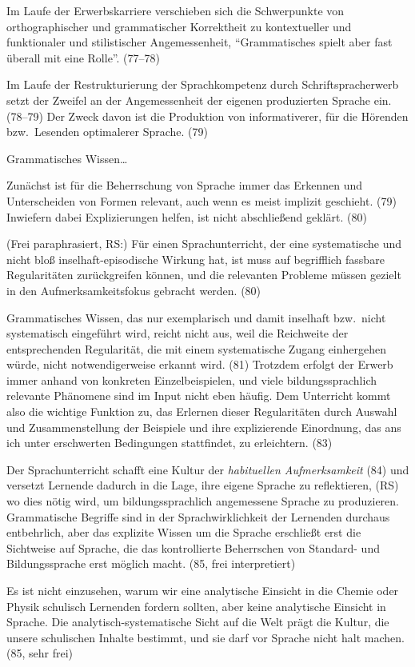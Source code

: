 Im Laufe der Erwerbskarriere verschieben sich die Schwerpunkte von orthographischer und grammatischer Korrektheit zu kontextueller und funktionaler und stilistischer Angemessenheit, "`Grammatisches spielt aber fast überall mit eine Rolle"'. (77--78)

Im Laufe der Restrukturierung der Sprachkompetenz durch Schriftspracherwerb setzt der Zweifel an der Angemessenheit der eigenen produzierten Sprache ein. (78--79)
Der Zweck davon ist die Produktion von informativerer, für die Hörenden bzw.\ Lesenden optimalerer Sprache. (79)

Grammatisches Wissen\ldots

Zunächst ist für die Beherrschung von Sprache immer das Erkennen und Unterscheiden von Formen relevant, auch wenn es meist implizit geschieht. (79)
Inwiefern dabei Explizierungen helfen, ist nicht abschließend geklärt. (80)

(Frei paraphrasiert, RS:) Für einen Sprachunterricht, der eine systematische und nicht bloß inselhaft-episodische Wirkung hat, ist muss auf begrifflich fassbare Regularitäten zurückgreifen können, und die relevanten Probleme müssen gezielt in den Aufmerksamkeitsfokus gebracht werden. (80)

Grammatisches Wissen, das nur exemplarisch und damit inselhaft bzw.\ nicht systematisch eingeführt wird, reicht nicht aus, weil die Reichweite der entsprechenden Regularität, die mit einem systematische Zugang einhergehen würde, nicht notwendigerweise erkannt wird. (81)
Trotzdem erfolgt der Erwerb immer anhand von konkreten Einzelbeispielen, und viele bildungssprachlich relevante Phänomene sind im Input nicht eben häufig.
Dem Unterricht kommt also die wichtige Funktion zu, das Erlernen dieser Regularitäten durch Auswahl und Zusammenstellung der Beispiele und ihre explizierende Einordnung, das ans ich unter erschwerten Bedingungen stattfindet, zu erleichtern. (83)

Der Sprachunterricht schafft eine Kultur der \textit{habituellen Aufmerksamkeit} (84) und versetzt Lernende dadurch in die Lage, ihre eigene Sprache zu reflektieren, (RS) wo dies nötig wird, um bildungssprachlich angemessene Sprache zu produzieren.
Grammatische Begriffe sind in der Sprachwirklichkeit der Lernenden durchaus entbehrlich, aber das explizite Wissen um die Sprache erschließt erst die Sichtweise auf Sprache, die das kontrollierte Beherrschen von Standard- und Bildungssprache erst möglich macht. (85, frei interpretiert)

Es ist nicht einzusehen, warum wir eine analytische Einsicht in die Chemie oder Physik schulisch Lernenden fordern sollten, aber keine analytische Einsicht in Sprache.
Die analytisch-systematische Sicht auf die Welt prägt die Kultur, die unsere schulischen Inhalte bestimmt, und sie darf vor Sprache nicht halt machen. (85, sehr frei)










